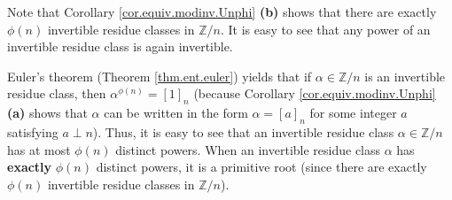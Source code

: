 \documentclass[numbers=enddot,12pt,final,onecolumn,notitlepage]{scrartcl}%
\numberwithin{exer}{subsection}
\theoremstyle{definition}
\begin{document}
Note that Corollary \ref{cor.equiv.modinv.Unphi} \textbf{(b)} shows that
there are exactly $\phi\left(  n\right)  $ invertible residue classes in
$\mathbb{Z}/n$. It is easy to see that any power of an invertible residue
class is again invertible.

Euler's theorem (Theorem \ref{thm.ent.euler}) yields that if $\alpha
\in\mathbb{Z}/n$ is an invertible residue class, then $\alpha^{\phi\left(
n\right)  }=\left[  1\right]  _{n}$ (because Corollary
\ref{cor.equiv.modinv.Unphi} \textbf{(a)} shows that $\alpha$ can be written
in the form $\alpha=\left[  a\right]  _{n}$ for some integer $a$ satisfying
$a\perp n$). Thus, it is easy to see that an invertible residue class
$\alpha\in\mathbb{Z}/n$ has at most $\phi\left(  n\right)  $ distinct powers.
When an invertible residue class $\alpha$ has \textbf{exactly} $\phi\left(
n\right)  $ distinct powers, it is a primitive root (since there are exactly
$\phi\left(  n\right)  $ invertible residue classes in $\mathbb{Z}/n$).
\end{document}
